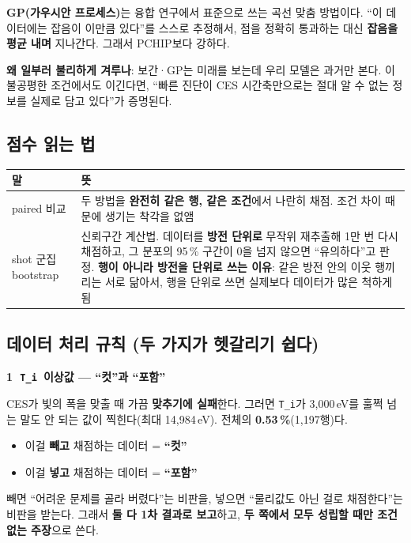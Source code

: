 \documentclass[10pt]{article}
\newcommand{\Ti}{\texttt{T\_i}}
\begin{document}
\textbf{GP(가우시안 프로세스)}는 융합 연구에서 표준으로 쓰는 곡선 맞춤 방법이다.
``이 데이터에는 잡음이 이만큼 있다''를 스스로 추정해서, 점을 정확히 통과하는 대신
\textbf{잡음을 평균 내며} 지나간다. 그래서 PCHIP보다 강하다.

\textbf{왜 일부러 불리하게 겨루나}: 보간·GP는 미래를 보는데 우리 모델은 과거만 본다.
이 불공평한 조건에서도 이긴다면, ``빠른 진단이 CES 시간축만으로는 절대 알 수 없는 정보를
실제로 담고 있다''가 증명된다.

\subsection{점수 읽는 법}

\begin{center}
\begin{tabularx}{\textwidth}{@{}l L@{}}
\toprule
\textbf{말} & \textbf{뜻} \\
\midrule
paired 비교 & 두 방법을 \textbf{완전히 같은 행, 같은 조건}에서 나란히 채점.
  조건 차이 때문에 생기는 착각을 없앰 \\
shot 군집 bootstrap & 신뢰구간 계산법. 데이터를 \textbf{방전 단위로} 무작위 재추출해
  1만 번 다시 채점하고, 그 분포의 95\,\% 구간이 0을 넘지 않으면 ``유의하다''고 판정.
  \textbf{행이 아니라 방전을 단위로 쓰는 이유}: 같은 방전 안의 이웃 행끼리는 서로 닮아서,
  행을 단위로 쓰면 실제보다 데이터가 많은 척하게 됨 \\
\bottomrule
\end{tabularx}
\end{center}

\subsection{데이터 처리 규칙 (두 가지가 헷갈리기 쉽다)}
\label{sec:cut}

\textbf{\textcircled{1} \Ti\ 이상값 --- ``컷''과 ``포함''}

CES가 빛의 폭을 맞출 때 가끔 \textbf{맞추기에 실패}한다. 그러면 \Ti 가 3{,}000\,eV를
훌쩍 넘는 말도 안 되는 값이 찍힌다(최대 14{,}984\,eV). 전체의 \textbf{0.53\,\%}(1{,}197행)다.

\begin{itemize}
\item 이걸 \textbf{빼고} 채점하는 데이터 = \textbf{``컷''}
\item 이걸 \textbf{넣고} 채점하는 데이터 = \textbf{``포함''}
\end{itemize}

빼면 ``어려운 문제를 골라 버렸다''는 비판을, 넣으면 ``물리값도 아닌 걸로 채점한다''는
비판을 받는다. 그래서 \textbf{둘 다 1차 결과로 보고}하고, \textbf{두 쪽에서 모두 성립할
때만 조건 없는 주장}으로 쓴다.
\end{document}
